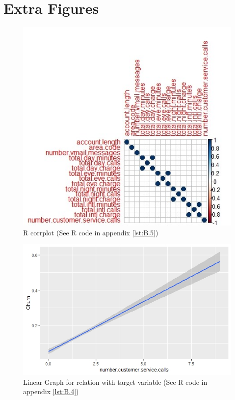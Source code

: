 \documentclass[a4paper,12pt]{report}
\begin{document}
\chapter{Extra Figures}
\begin{figure}[!htbp]
\vspace{-5pt}
\centering
\includegraphics[scale = 1]{corrplot.jpeg}
\caption{R corrplot (See R code in appendix \ref{lst:B.5})}
\label{fig:A.1}
\end{figure}
\FloatBarrier

\begin{figure}[!htbp]
\vspace{-10pt}
\centering
\includegraphics[scale = 0.6]{CustCallVsChurn.jpeg}
\caption{Linear Graph for relation with target variable (See R code in appendix \ref{lst:B.4})}
\label{fig:A.2}
\end{figure}
\FloatBarrier
\end{document}
